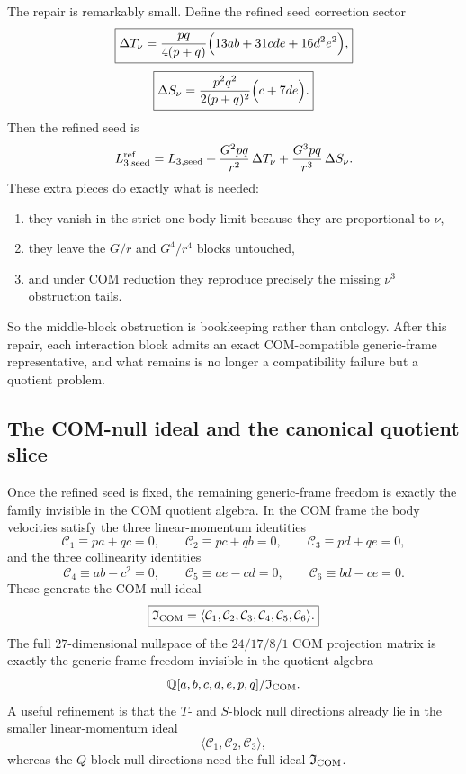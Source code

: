 \documentclass[11pt]{article}
\begin{document}
The repair is remarkably small.  Define the refined seed correction sector
\[
\boxed{
\Delta T_\nu
=
\frac{pq}{4(p+q)}\Bigl(13ab+31cde+16d^2e^2\Bigr),}
\]
\[
\boxed{
\Delta S_\nu
=
\frac{p^2q^2}{2(p+q)^2}\Bigl(c+7de\Bigr).}
\]
Then the refined seed is
\[
L_{3,\rm seed}^{\rm ref}
=
L_{3,\rm seed}
+\frac{G^2pq}{r^2}\,\Delta T_\nu
+\frac{G^3pq}{r^3}\,\Delta S_\nu.
\]
These extra pieces do exactly what is needed:
\begin{enumerate}
  \item they vanish in the strict one-body limit because they are proportional
  to $\nu$,
  \item they leave the $G/r$ and $G^4/r^4$ blocks untouched,
  \item and under COM reduction they reproduce precisely the missing
  $\nu^3$ obstruction tails.
\end{enumerate}
So the middle-block obstruction is bookkeeping rather than ontology.  After this
repair, each interaction block admits an exact COM-compatible generic-frame
representative, and what remains is no longer a compatibility failure but a
quotient problem.

\subsection{The COM-null ideal and the canonical quotient slice}
\label{sec:compmass-com-null}

Once the refined seed is fixed, the remaining generic-frame freedom is exactly
the family invisible in the COM quotient algebra.  In the COM frame the body
velocities satisfy the three linear-momentum identities
\[
\boxed{
\mathcal C_1\equiv pa+qc=0,
\qquad
\mathcal C_2\equiv pc+qb=0,
\qquad
\mathcal C_3\equiv pd+qe=0,}
\]
and the three collinearity identities
\[
\boxed{
\mathcal C_4\equiv ab-c^2=0,
\qquad
\mathcal C_5\equiv ae-cd=0,
\qquad
\mathcal C_6\equiv bd-ce=0.}
\]
These generate the COM-null ideal
\[
\boxed{
\mathfrak I_{\rm COM}
=
\langle \mathcal C_1,\mathcal C_2,\mathcal C_3,\mathcal C_4,\mathcal C_5,\mathcal C_6\rangle.}
\]
The full $27$-dimensional nullspace of the $24/17/8/1$ COM projection matrix is
exactly the generic-frame freedom invisible in the quotient algebra
\[
\mathbb Q[a,b,c,d,e,p,q]/\mathfrak I_{\rm COM}.
\]
A useful refinement is that the $T$- and $S$-block null directions already lie
in the smaller linear-momentum ideal
\[
\langle \mathcal C_1,\mathcal C_2,\mathcal C_3\rangle,
\]
whereas the $Q$-block null directions need the full ideal
$\mathfrak I_{\rm COM}$.
\end{document}
